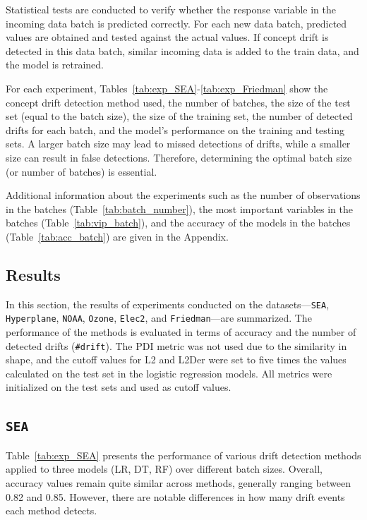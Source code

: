 \documentclass[pdflatex,sn-mathphys-ay]{sn-jnl}%
\theoremstyle{thmstyleone}%
\theoremstyle{thmstyletwo}%
\theoremstyle{thmstylethree}%
\begin{document}
Statistical tests are conducted to verify whether the response variable in the incoming data batch is predicted correctly. For each new data batch, predicted values are obtained and tested against the actual values. If concept drift is detected in this data batch, similar incoming data is added to the train data, and the model is retrained.  

For each experiment, Tables~\ref{tab:exp_SEA}-\ref{tab:exp_Friedman} show the concept drift detection method used, the number of batches, the size of the test set (equal to the batch size), the size of the training set, the number of detected drifts for each batch, and the model's performance on the training and testing sets. A larger batch size may lead to missed detections of drifts, while a smaller size can result in false detections. Therefore, determining the optimal batch size (or number of batches) is essential.

Additional information about the experiments such as the number of observations in the batches (Table~\ref{tab:batch_number}), the most important variables in the batches (Table~\ref{tab:vip_batch}), and the accuracy of the models in the batches (Table~\ref{tab:acc_batch}) are given in the Appendix.

\subsection{Results}

In this section, the results of experiments conducted on the datasets---\texttt{SEA}, \texttt{Hyperplane}, \texttt{NOAA}, \texttt{Ozone}, \texttt{Elec2}, and \texttt{Friedman}---are summarized. The performance of the methods is evaluated in terms of accuracy and the number of detected drifts (\texttt{\#drift}). The PDI metric was not used due to the similarity in shape, and the cutoff values for L2 and L2Der were set to five times the values calculated on the test set in the logistic regression models. All metrics were initialized on the test sets and used as cutoff values.

\subsection*{\texttt{SEA}}

Table~\ref{tab:exp_SEA} presents the performance of various drift detection methods applied to three models (LR, DT, RF) over different batch sizes. Overall, accuracy values remain quite similar across methods, generally ranging between 0.82 and 0.85. However, there are notable differences in how many drift events each method detects.
\end{document}
